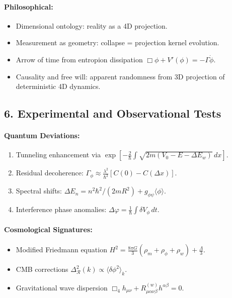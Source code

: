 \documentclass[12pt]{article}
\begin{document}
\paragraph{Philosophical:}
\begin{itemize}
  \item Dimensional ontology: reality as a 4D projection.  
  \item Measurement as geometry: collapse = projection kernel evolution.  
  \item Arrow of time from entropion dissipation  
    \(\Box\phi+V'(\phi)=-\Gamma\dot\phi\).  
  \item Causality and free will: apparent randomness from 3D projection of deterministic 4D dynamics.
\end{itemize}

\subsection*{6. Experimental and Observational Tests}

\paragraph{Quantum Deviations:}
\begin{enumerate}
  \item Tunneling enhancement via  
    \(\exp[-\tfrac{2}{\hbar}\!\int\!\sqrt{2m(V_0-E-\Delta E_w)}\,dx]\).  
  \item Residual decoherence:  
    \(\Gamma_\phi\approx\tfrac{\lambda^2}{\hbar^2}[C(0)-C(\Delta x)]\).  
  \item Spectral shifts:  
    \(\Delta E_n=n^2\hbar^2/(2mR^2)+g_{\phi\psi}\langle\phi\rangle\).  
  \item Interference phase anomalies:  
    \(\Delta\varphi=\tfrac{1}{\hbar}\int\delta V_\phi\,dt\).
\end{enumerate}

\paragraph{Cosmological Signatures:}
\begin{itemize}
  \item Modified Friedmann equation  
    \(H^2=\tfrac{8\pi G}{3}(\rho_m+\rho_\phi+\rho_w)+\tfrac{\Lambda}{3}.\)  
  \item CMB corrections  
    \(\Delta_{\mathcal{R}}^2(k)\propto\langle\delta\phi^2\rangle_k.\)  
  \item Gravitational wave dispersion  
    \(\Box_4h_{\mu\nu}+R^{(w)}_{\mu\alpha\nu\beta}h^{\alpha\beta}=0.\)
\end{itemize}
\end{document}

